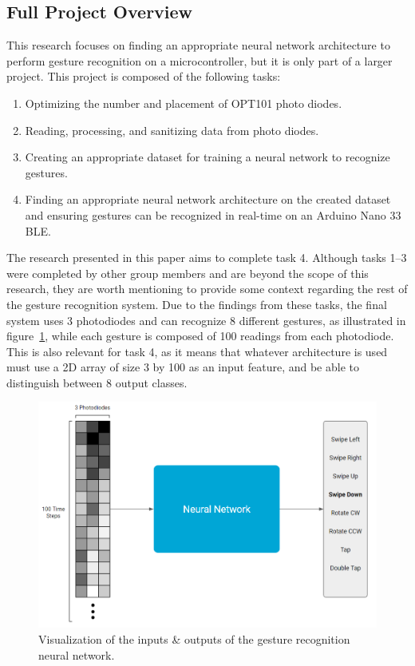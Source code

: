 \subsection{Full Project Overview}\label{subsec:project-pipeline}
This research focuses on finding an appropriate neural network architecture to perform gesture recognition on a microcontroller, but it is only part of a larger project.
This project is composed of the following tasks:
\begin{enumerate}
    \item Optimizing the number and placement of OPT101 photo diodes.
    \item Reading, processing, and sanitizing data from photo diodes.
    \item Creating an appropriate dataset for training a neural network to recognize gestures.
    \item Finding an appropriate neural network architecture on the created dataset and ensuring gestures can be recognized in real-time on an Arduino Nano 33 BLE\@.
\end{enumerate}

The research presented in this paper aims to complete task 4.
Although tasks 1--3 were completed by other group members and are beyond the scope of this research, they are worth mentioning to provide some context regarding the rest of the gesture recognition system.
Due to the findings from these tasks, the final system uses 3 photodiodes and can recognize 8 different gestures, as illustrated in figure~\ref{fig:system}\@, while each gesture is composed of 100 readings from each photodiode.
This is also relevant for task 4, as it means that whatever architecture is used must use a 2D array of size 3 by 100 as an input feature, and be able to distinguish between 8 output classes.

\begin{figure}[h]
    \centering
    \captionsetup{justification=centering}
    \includegraphics[width=\linewidth]{figures/system}
    \caption{Visualization of the inputs \& outputs of the gesture recognition neural network.}
    \label{fig:system}
\end{figure}
